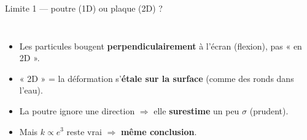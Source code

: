 \documentclass[11pt,aspectratio=169]{beamer}
\begin{document}
\begin{frame}{Limite 1 --- poutre (1D) ou plaque (2D) ?}
  \begin{columns}[c]
    \centering
    \footnotesize
    \begin{itemize}
      \item Les particules bougent \textbf{perpendiculairement} à l'écran
            (flexion), pas « en 2D ».
      \item « 2D » = la déformation s'\textbf{étale sur la surface} (comme des
            ronds dans l'eau).
      \item La poutre ignore une direction $\Rightarrow$ elle
            \textbf{surestime} un peu $\sigma$ (prudent).
      \item Mais $k\propto e^3$ reste vrai $\Rightarrow$ \textbf{même
            conclusion}.
    \end{itemize}
  \end{columns}
\end{frame}
\end{document}
